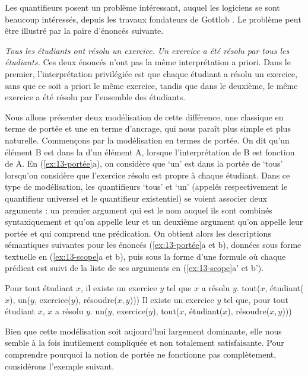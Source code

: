 {Les quantifieurs posent un problème intéressant, auquel les logiciens se sont beaucoup intéressés, depuis les travaux fondateurs de Gottlob \citet{frege1892uber}. Le problème peut être illustré par la paire d’énoncés suivante.

\ea\label{ex:13-portée}
\ea \textit{Tous les étudiants ont résolu un exercice.}
\ex \textit{Un exercice a été résolu par tous les étudiants.}\z\z
Ces deux énoncés n’ont pas la même interprétation a priori. Dans le premier, l’interprétation privilégiée est que chaque étudiant a résolu un exercice, sans que ce soit a priori le même exercice, tandis que dans le deuxième, le même exercice a été résolu par l’ensemble des étudiants. 

Nous allons présenter deux modélisation de cette différence, une classique en terme de portée et une en terme d'ancrage, qui nous paraît plus simple et plus naturelle.
Commençons par la modélisation en termes de portée. On dit qu’un élément B est dans la  d’un élément A, lorsque l’interprétation de B est fonction de A. En (\ref{ex:13-portée}a), on considère que ‘un’ est dans la portée de ‘tous’ lorsqu’on considère que l’exercice résolu est propre à chaque étudiant. Dans ce type de modélisation, les quantifieurs ‘tous’ et ‘un’ (appelés respectivement le quantifieur universel et le quantifieur existentiel) se voient associer deux arguments : un premier argument qui est le nom auquel ils sont combinés syntaxiquement et qu’on appelle leur  et un deuxième argument qu’on appelle leur portée et qui comprend une prédication. On obtient alors les descriptions sémantiques suivantes pour les énoncés (\ref{ex:13-portée}a et b), données sous forme textuelle en (\ref{ex:13-scope}a et b), puis sous la forme d’une formule où chaque prédicat est suivi de la liste de ses arguments en (\ref{ex:13-scope}a’ et b’).


\begin{exe}
    \ex\label{ex:13-scope}
	\begin{xlist}[b'.]
		 Pour tout étudiant $x$, il existe un exercice $y$ tel que $x$ a résolu $y$.
		 tout($x$, étudiant($x$), un($y$, exercice($y$), résoudre($x,y$)))
		 Il existe un exercice $y$ tel que, pour tout étudiant $x$, $x$ a résolu $y$.
		 un($y$, exercice($y$), tout($x$, étudiant($x$), résoudre($x,y$)))
	\end{xlist}	
\end{exe}

Bien que cette modélisation soit aujourd’hui largement dominante, elle nous semble à la fois inutilement compliquée et non totalement satisfaisante. Pour comprendre pourquoi la notion de portée ne fonctionne pas complètement, considérons l’exemple suivant.

}
